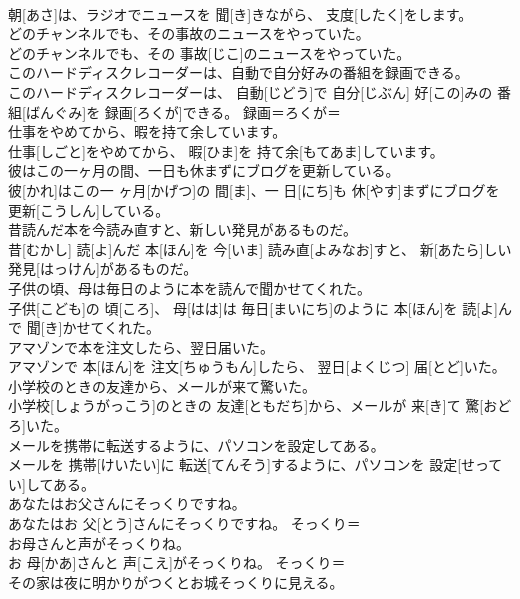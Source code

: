 \documentclass[8pt]{extreport}
\begin{document}
\begin{CJK}{UTF8}{min}
\\	朝[あさ]は、ラジオでニュースを 聞[き]きながら、 支度[したく]をします。	
\\	どのチャンネルでも、その事故のニュースをやっていた。	
\\	どのチャンネルでも、その 事故[じこ]のニュースをやっていた。	
\\	このハードディスクレコーダーは、自動で自分好みの番組を録画できる。	
\\	このハードディスクレコーダーは、 自動[じどう]で 自分[じぶん] 好[この]みの 番組[ばんぐみ]を 録画[ろくが]できる。	録画＝ろくが＝ 
\\	仕事をやめてから、暇を持て余しています。	
\\	仕事[しごと]をやめてから、 暇[ひま]を 持て余[もてあま]しています。	
\\	彼はこの一ヶ月の間、一日も休まずにブログを更新している。	
\\	彼[かれ]はこの一 ヶ月[かげつ]の 間[ま]、一 日[にち]も 休[やす]まずにブログを 更新[こうしん]している。	
\\	昔読んだ本を今読み直すと、新しい発見があるものだ。	
\\	昔[むかし] 読[よ]んだ 本[ほん]を 今[いま] 読み直[よみなお]すと、 新[あたら]しい 発見[はっけん]があるものだ。	
\\	子供の頃、母は毎日のように本を読んで聞かせてくれた。	
\\	子供[こども]の 頃[ころ]、 母[はは]は 毎日[まいにち]のように 本[ほん]を 読[よ]んで 聞[き]かせてくれた。	
\\	アマゾンで本を注文したら、翌日届いた。	
\\	アマゾンで 本[ほん]を 注文[ちゅうもん]したら、 翌日[よくじつ] 届[とど]いた。	
\\	小学校のときの友達から、メールが来て驚いた。	
\\	小学校[しょうがっこう]のときの 友達[ともだち]から、メールが 来[き]て 驚[おどろ]いた。	
\\	メールを携帯に転送するように、パソコンを設定してある。	
\\	メールを 携帯[けいたい]に 転送[てんそう]するように、パソコンを 設定[せってい]してある。	
\\	あなたはお父さんにそっくりですね。	
\\	あなたはお 父[とう]さんにそっくりですね。	そっくり＝ 
\\	お母さんと声がそっくりね。	
\\	お 母[かあ]さんと 声[こえ]がそっくりね。	そっくり＝ 
\\	その家は夜に明かりがつくとお城そっくりに見える。	

\end{CJK}
\end{document}
